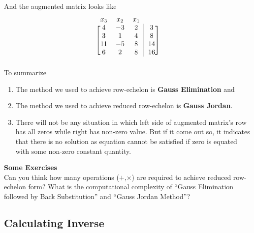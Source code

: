 \documentclass{article}
\begin{document}
    And the augmented matrix looks like
    \[
    \begin{blockarray}{cccc}
        x_3 & x_2 & x_1 && \\
        \begin{block}{[ccc|c]}
        4 & -3 & 2 & 3 \\
        3 & 1 & 4 & 8 \\
        11 & -5 & 8 & 14\\
        6 & 2 & 8 & 16 \\
        \end{block}
        \end{blockarray}
        \]
To summarize
\begin{enumerate}
\item The method we used to achieve row-echelon is \textbf{Gauss Elimination} and 
\item The method we used to achieve reduced row-echelon is \textbf{Gauss Jordan}.
\item There will not be any situation in which left side of augmented matrix's row has all zeros while right has non-zero value. But if it come out so, it indicates that there is no solution as equation cannot be satisfied if zero is equated with some non-zero constant quantity.
 \end{enumerate}  
 
\textbf{Some Exercises}\\
Can you think how many operations ($+$,$\times$) are required to achieve reduced row-echelon form? What is the computational complexity of ``Gauss Elimination followed by Back Substitution'' and ``Gauss Jordan Method''? 

\subsection{Calculating Inverse}
\end{document}
